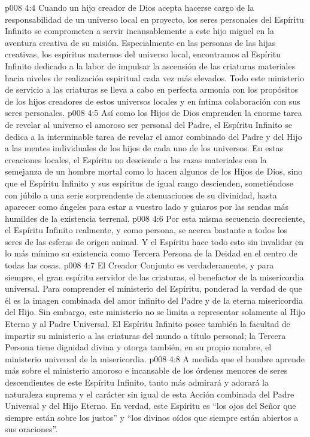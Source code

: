 \vs p008 4:4 \pc Cuando un hijo creador de Dios acepta hacerse cargo de la responsabilidad de un universo local en proyecto, los seres personales del Espíritu Infinito se comprometen a servir incansablemente a este hijo miguel en la aventura creativa de su misión. Especialmente en las personas de las hijas creativas, los espíritus maternos del universo local, encontramos al Espíritu Infinito dedicado a la labor de impulsar la ascensión de las criaturas materiales hacia niveles de realización espiritual cada vez más elevados. Todo este ministerio de servicio a las criaturas se lleva a cabo en perfecta armonía con los propósitos de los hijos creadores de estos universos locales y en íntima colaboración con sus seres personales.
\vs p008 4:5 Así como los Hijos de Dios emprenden la enorme tarea de revelar al universo el amoroso ser personal del Padre, el Espíritu Infinito se dedica a la interminable tarea de revelar el amor combinado del Padre y del Hijo a las mentes individuales de los hijos de cada uno de los universos. En estas creaciones locales, el Espíritu no desciende a las razas materiales con la semejanza de un hombre mortal como lo hacen algunos de los Hijos de Dios, sino que el Espíritu Infinito y sus espíritus de igual rango descienden, sometiéndose con júbilo a una serie sorprendente de atenuaciones de su divinidad, hasta aparecer como ángeles para estar a vuestro lado y guiaros por las sendas más humildes de la existencia terrenal.
\vs p008 4:6 Por esta misma secuencia decreciente, el Espíritu Infinito realmente, y como persona, se acerca bastante a todos los seres de las esferas de origen animal. Y el Espíritu hace todo esto sin invalidar en lo más mínimo su existencia como Tercera Persona de la Deidad en el centro de todas las cosas.
\vs p008 4:7 \pc El Creador Conjunto es verdaderamente, y para siempre, el gran espíritu servidor de las criaturas, el benefactor de la misericordia universal. Para comprender el ministerio del Espíritu, ponderad la verdad de que él es la imagen combinada del amor infinito del Padre y de la eterna misericordia del Hijo. Sin embargo, este ministerio no se limita a representar solamente al Hijo Eterno y al Padre Universal. El Espíritu Infinito posee también la facultad de impartir su ministerio a las criaturas del mundo a título personal; la Tercera Persona tiene dignidad divina y otorga también, en su propio nombre, el ministerio universal de la misericordia.
\vs p008 4:8 A medida que el hombre aprende más sobre el ministerio amoroso e incansable de los órdenes menores de seres descendientes de este Espíritu Infinito, tanto más admirará y adorará la naturaleza suprema y el carácter sin igual de esta Acción combinada del Padre Universal y del Hijo Eterno. En verdad, este Espíritu es “los ojos del Señor que siempre están sobre los justos” y “los divinos oídos que siempre están abiertos a sus oraciones”.
